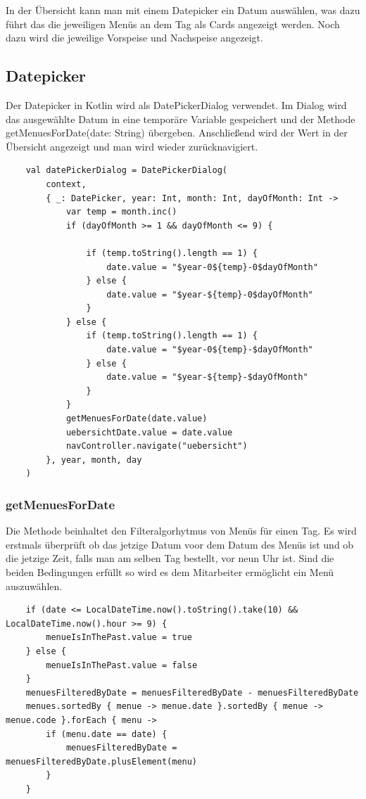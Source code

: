 In der Übersicht kann man mit einem Datepicker ein Datum auswählen, was dazu führt das die jeweiligen Menüs an dem Tag 
als Cards angezeigt werden. Noch dazu wird die jeweilige Vorspeise und Nachspeise angezeigt.

\subsection{Datepicker}
Der Datepicker in Kotlin wird als DatePickerDialog verwendet. Im Dialog wird das ausgewählte Datum in eine temporäre Variable gespeichert
und der Methode getMenuesForDate(date: String) übergeben. Anschließend wird der Wert in der Übersicht angezeigt und man wird wieder zurücknavigiert.

\begin{lstlisting}
    val datePickerDialog = DatePickerDialog(
        context,
        { _: DatePicker, year: Int, month: Int, dayOfMonth: Int ->
            var temp = month.inc()
            if (dayOfMonth >= 1 && dayOfMonth <= 9) {

                if (temp.toString().length == 1) {
                    date.value = "$year-0${temp}-0$dayOfMonth"
                } else {
                    date.value = "$year-${temp}-0$dayOfMonth"
                }
            } else {
                if (temp.toString().length == 1) {
                    date.value = "$year-0${temp}-$dayOfMonth"
                } else {
                    date.value = "$year-${temp}-$dayOfMonth"
                }
            }
            getMenuesForDate(date.value)
            uebersichtDate.value = date.value
            navController.navigate("uebersicht")
        }, year, month, day
    )
\end{lstlisting}


\subsubsection{getMenuesForDate}
Die Methode beinhaltet den Filteralgorhytmus von Menüs für einen Tag. Es wird erstmals überprüft ob das jetzige Datum voor dem Datum des Menüs ist
und ob die jetzige Zeit, falls man am selben Tag bestellt, vor neun Uhr ist. Sind die beiden Bedingungen erfüllt so wird es dem Mitarbeiter ermöglicht ein Menü auszuwählen.

\begin{lstlisting}
    if (date <= LocalDateTime.now().toString().take(10) && LocalDateTime.now().hour >= 9) {
        menueIsInThePast.value = true
    } else {
        menueIsInThePast.value = false
    }
    menuesFilteredByDate = menuesFilteredByDate - menuesFilteredByDate
    menues.sortedBy { menue -> menue.date }.sortedBy { menue -> menue.code }.forEach { menu ->
        if (menu.date == date) {
            menuesFilteredByDate = menuesFilteredByDate.plusElement(menu)
        }
    }
\end{lstlisting}

